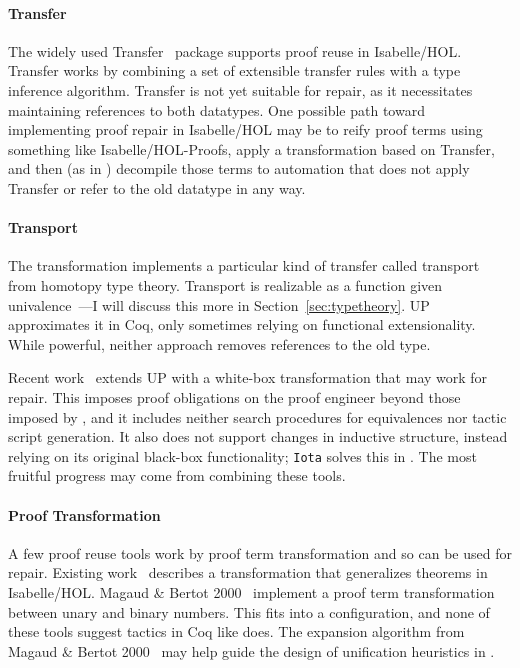 \paragraph{Transfer}
The widely used Transfer~\cite{Huffman2013} package supports proof reuse in Isabelle/HOL. %
Transfer works by combining a set of extensible transfer rules with a type inference algorithm.
Transfer is not yet suitable for repair, as it necessitates maintaining references to both datatypes.
One possible path toward implementing proof repair in Isabelle/HOL may be to reify proof terms using something like
Isabelle/HOL-Proofs, apply a transformation based on Transfer, and then (as in \toolname) decompile those terms to automation that does not apply Transfer or refer to the old datatype in any way.

\paragraph{Transport} The \toolnamec transformation implements a particular kind of transfer called transport from homotopy type theory.
Transport is realizable as a function given univalence~\cite{univalent2013homotopy}---I will discuss this more in Section~\ref{sec:typetheory}.
UP~\cite{tabareau2017equivalences} approximates it
in Coq, only sometimes relying on functional extensionality.
While powerful, neither approach removes references to the old type. %

Recent work~\cite{tabareau2019marriage} extends UP with 
a white-box transformation that may work for repair.
This imposes proof obligations on the proof engineer beyond those imposed by \toolnamec,
and it includes neither search procedures for equivalences nor tactic script generation.
It also does not support changes in inductive structure,
instead relying on its original black-box functionality;
\lstinline{Iota} solves this in \toolnamec. %
The most fruitful progress may come from combining these tools. %

\paragraph{Proof Transformation}
A few proof reuse tools work by proof term transformation and so can be used for repair. %
Existing work~\cite{Johnsen2004} describes a transformation that generalizes theorems in Isabelle/HOL.
Magaud \& Bertot 2000~\cite{magaud2000changing} implement a proof term transformation between
unary and binary numbers. 
This fits into a \toolnamec configuration,
and none of these tools suggest tactics in Coq like \toolnamec does.
The expansion algorithm from Magaud \& Bertot 2000~\cite{magaud2000changing} may help guide the design
of unification heuristics in \toolnamec.

